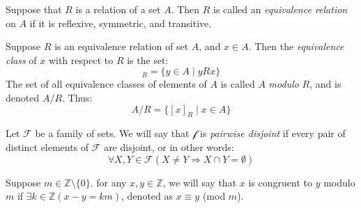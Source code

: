 \documentclass[nobib,notoc]{tufte-handout}
\begin{document}
\begin{defi}
	Suppose that \(R\) is a relation of a set \(A\). Then \(R\) is called an \emph{equivalence relation} on \(A\) if it is reflexive, symmetric, and transitive.
\end{defi}
\begin{defi}
	Suppose \(R\) is an equivalence relation of set \(A\), and \(x\in A\). Then the \emph{equivalence class} of \(x\) with respect to \(R\) is the set:
	\begin{equation*}
		[x]_R=\{y\in A\mid yRx\}
	\end{equation*}
	The set of all equivalence classes of elements of \(A\) is called \(A\) \emph{modulo} \(R\), and is denoted \(A/R\). Thus:
	\begin{equation*}
		A/R=\{[x]_R\mid x\in A\}
	\end{equation*}
\end{defi}
\begin{defi}
	Let \(\mathcal{F}\) be a family of sets. We will say that \(\mathcal{f}\) is \emph{pairwise disjoint} if every pair of distinct elements of \(\mathcal{F}\) are disjoint, or in other words:
	\begin{equation*}
		\forall X,Y\in\mathcal{F}(X\neq Y\Rightarrow X\cap Y=\emptyset)
	\end{equation*}
\end{defi}
\begin{defi}[Congruence]
	Suppose \(m\in\mathbb{Z}\setminus\{0\}\). for any \(x,y\in\mathbb{Z}\), we will say that \(x\) is congruent to \(y\) modulo \(m\) if \(\exists k\in\mathbb{Z}(x-y=km)\), denoted as \(x\equiv y\) (mod \(m\)).
\end{defi}
\end{document}
